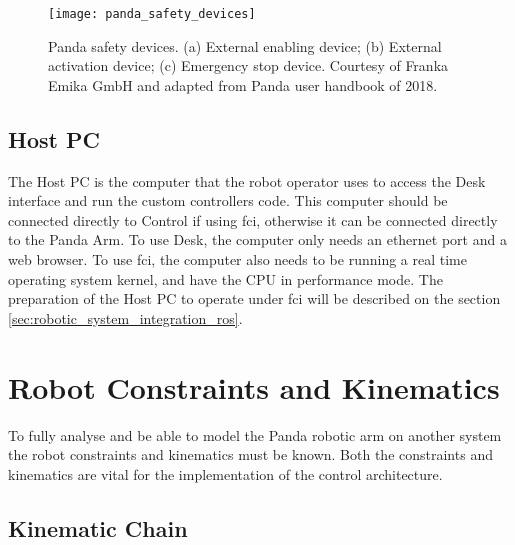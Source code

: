\begin{figure}[htbp]
    \centering
	\texttt{[image: panda\_safety\_devices]}
	\caption[Panda safety devices.]{Panda safety devices. (a) External enabling device; (b) External activation device; (c) Emergency stop device. Courtesy of Franka Emika GmbH and adapted from Panda user handbook of 2018.}
	\label{fig:panda_safety_devices}
\end{figure}


\subsection*{Host PC}
\label{subsec:robotic_system_physical_description_hostpc}

The Host PC is the computer that the robot operator uses to access the Desk interface and run the custom controllers code. This computer should be connected directly to Control if using \gls{fci}, otherwise it can be connected directly to the Panda Arm. To use Desk, the computer only needs an ethernet port and a web browser. To use \gls{fci}, the computer also needs to be running a real time operating system kernel, and have the CPU in performance mode. The preparation of the Host PC to operate under \gls{fci} will be described on the section \ref{sec:robotic_system_integration_ros}.




\section{Robot Constraints and Kinematics}
\label{sec:robotic_system_constraints_kinematics}

To fully analyse and be able to model the Panda robotic arm on another system the robot constraints and kinematics must be known. Both the constraints and kinematics are vital for the implementation of the control architecture.

\subsection{Kinematic Chain}
\label{robotic_system_constraints_kinematics_kinematic_chain}

